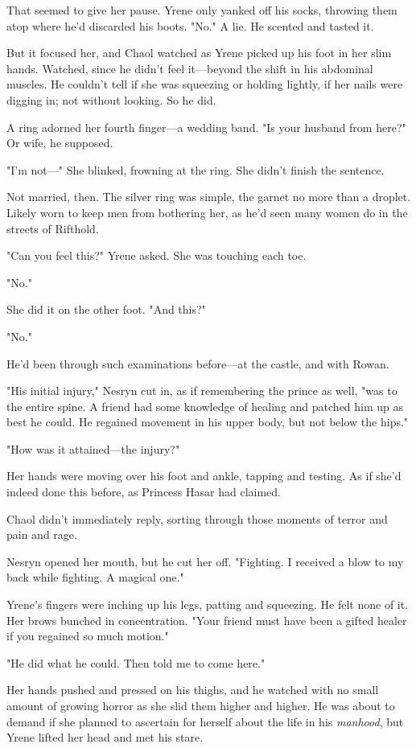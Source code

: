 That seemed to give her pause.
Yrene only yanked off his socks, throwing them atop where he'd discarded his boots.
"No."
A lie.
He scented and tasted it.

But it focused her, and Chaol watched as Yrene picked up his foot in her slim hands.
Watched, since he didn't feel it---beyond the shift in his abdominal muscles.
He couldn't tell if she was squeezing or holding lightly, if her nails were digging in; not without looking.
So he did.

A ring adorned her fourth finger---a wedding band.
"Is your husband from here?"
Or wife, he supposed.

"I'm not---" She blinked, frowning at the ring.
She didn't finish the sentence.

Not married, then.
The silver ring was simple, the garnet no more than a droplet.
Likely worn to keep men from bothering her, as he'd seen many women do in the streets of Rifthold.

"Can you feel this?"
Yrene asked.
She was touching each toe.

"No."

She did it on the other foot.
"And this?"

"No."

He'd been through such examinations before---at the castle, and with Rowan.

"His initial injury," Nesryn cut in, as if remembering the prince as well, "was to the entire spine.
A friend had some knowledge of healing and patched him up as best he could.
He regained movement in his upper body, but not below the hips."

"How was it attained---the injury?"

Her hands were moving over his foot and ankle, tapping and testing.
As if she'd indeed done this before, as Princess Hasar had claimed.

Chaol didn't immediately reply, sorting through those moments of terror and pain and rage.

Nesryn opened her mouth, but he cut her off.
"Fighting.
I received a blow to my back while fighting.
A magical one."

Yrene's fingers were inching up his legs, patting and squeezing.
He felt none of it.
Her brows bunched in concentration.
"Your friend must have been a gifted healer if you regained so much motion."

"He did what he could.
Then told me to come here."

Her hands pushed and pressed on his thighs, and he watched with no small amount of growing horror as she slid them higher and higher.
He was about to demand if she planned to ascertain for herself about the life in his \emph{manhood}, but Yrene lifted her head and met his stare.

